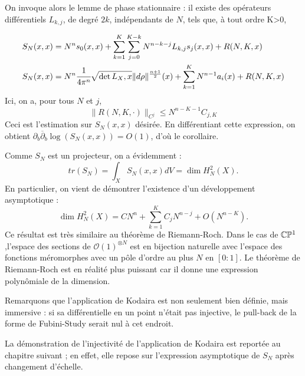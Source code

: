 On invoque alors le lemme de phase stationnaire : il existe des opérateurs différentiels $L_{k,j}$, de degré $2k$, indépendants de $N$, tels que, à tout ordre K>0, 

\begin{align*}
	S_N(x,x) &= N^n s_0(x,x) + \sum_{k=1}^{K}\sum_{j=0}^{K-k}N^{n-k-j}L_{k,j}s_j(x,x) + R(N,K,x)\\
		S_N(x,x) &= N^n \cfrac{1}{4\pi^n}\sqrt{\det{L_X,x}}\|d\rho\|^{\frac{n+1}{2}}(x) + \sum_{k=1}^K N^{n-1}a_i(x) + R(N,K,x)
\end{align*}
Ici, on a, pour tous $N$ et $j$,
\begin{equation*}
  \|R(N,K,\cdot)\|_{C^j} \leq N^{n-K-1}C_{j,K}
\end{equation*}
Ceci est l'estimation sur $S_N(x,x)$ désirée. En différentiant cette expression, on obtient $\partial_b\overline{\partial}_b \log(S_N(x,x)) = O(1)$, d'où le corollaire.

\begin{rem}
Comme $S_N$ est un projecteur, on a évidemment :
\begin{equation}
  tr(S_N) = \int_XS_N(x,x)dV=\dim H^2_N(X).
\end{equation}
En particulier, on vient de démontrer l'existence d'un développement asymptotique :
\begin{equation}
  \dim H^2_N(X) = CN^n+\sum_{k=1}^{K}C_jN^{n-j} + O(N^{n-K}).
\end{equation}
Ce résultat est très similaire au théorème de Riemann-Roch. Dans le cas de $\mathbb{C}\mathbb{P}^1$,l'espace des sections de $\mathcal{O}(1)^{\otimes N}$ est en bijection naturelle avec l'espace des fonctions méromorphes avec un pôle d'ordre au plus $N$ en $[0:1]$. Le théorème de Riemann-Roch est en réalité plus puissant car il donne une expression polynômiale de la dimension.
\end{rem}

Remarquons que l'application de Kodaira est non seulement bien définie, mais immersive : si sa différentielle en un point n'était pas injective, le pull-back de la forme de Fubini-Study serait nul à cet endroit.

La démonstration de l'injectivité de l'application de Kodaira est reportée au chapitre suivant ; en effet, elle repose sur l'expression asymptotique de $S_N$ après changement d'échelle.
